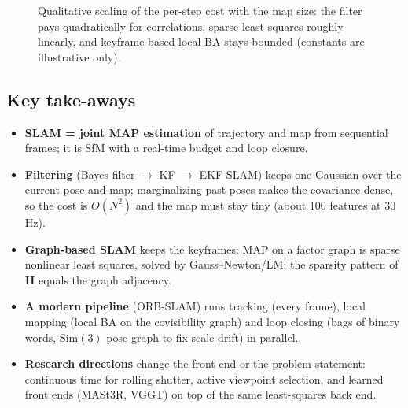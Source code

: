 \documentclass[11pt,a4paper]{article}
\newcommand{\bH}{\mathbf{H}}
\newcommand{\Sim}{\mathrm{Sim}(3)}
\theoremstyle{definition}
\theoremstyle{plain}
\theoremstyle{remark}
\begin{document}
\begin{figure}[htbp]\centering
{}
\caption{Qualitative scaling of the per-step cost with the map size: the filter pays quadratically for correlations, sparse least squares roughly linearly, and keyframe-based local BA stays bounded (constants are illustrative only).}
\end{figure}

\subsection*{Key take-aways}
\begin{itemize}
\item \textbf{SLAM = joint MAP estimation} of trajectory and map from sequential frames; it is SfM with a real-time budget and loop closure.
\item \textbf{Filtering} (Bayes filter $\to$ KF $\to$ EKF-SLAM) keeps one Gaussian over the current pose and map; marginalizing past poses makes the covariance dense, so the cost is $O(N^2)$ and the map must stay tiny (about 100 features at 30\,Hz).
\item \textbf{Graph-based SLAM} keeps the keyframes: MAP on a factor graph is sparse nonlinear least squares, solved by Gauss--Newton/LM; the sparsity pattern of $\bH$ equals the graph adjacency.
\item \textbf{A modern pipeline} (ORB-SLAM) runs tracking (every frame), local mapping (local BA on the covisibility graph) and loop closing (bags of binary words, $\Sim$ pose graph to fix scale drift) in parallel.
\item \textbf{Research directions} change the front end or the problem statement: continuous time for rolling shutter, active viewpoint selection, and learned front ends (MASt3R, VGGT) on top of the same least-squares back end.
\end{itemize}
\end{document}
